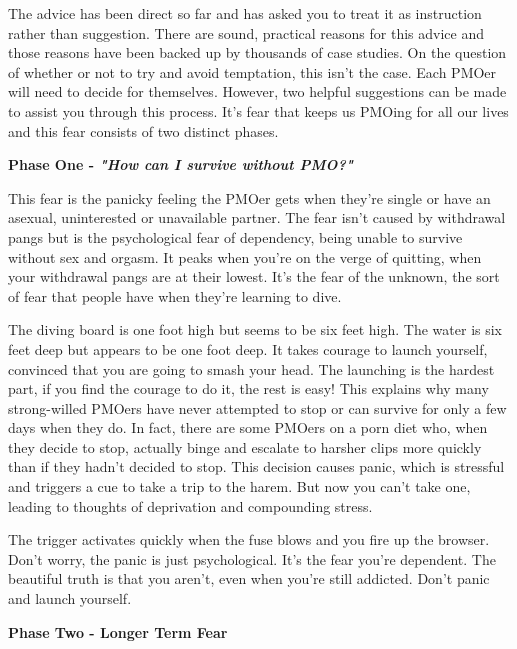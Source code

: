 \documentclass[easypeasy.tex]{subfiles}
\begin{document}
The advice has been direct so far and has asked you to treat it as instruction rather than suggestion. There are sound, practical reasons for this advice and those reasons have been backed up by thousands of case studies. On the question of whether or not to try and avoid temptation, this isn't the case. Each PMOer will need to decide for themselves. However, two helpful suggestions can be made to assist you through this process. It's fear that keeps us PMOing for all our lives and this fear consists of two distinct phases.

\textbf{Phase One - \textit{"How can I survive without PMO?"}}

This fear is the panicky feeling the PMOer gets when they're single or have an asexual, uninterested or unavailable partner. The fear isn't caused by withdrawal pangs but is the psychological fear of dependency, being unable to survive without sex and orgasm. It peaks when you're on the verge of quitting, when your withdrawal pangs are at their lowest. It's the fear of the unknown, the sort of fear that people have when they're learning to dive.

The diving board is one foot high but seems to be six feet high. The water is six feet deep but appears to be one foot deep. It takes courage to launch yourself, convinced that you are going to smash your head. The launching is the hardest part, if you find the courage to do it, the rest is easy! This explains why many strong-willed PMOers have never attempted to stop or can survive for only a few days when they do. In fact, there are some PMOers on a porn diet who, when they decide to stop, actually binge and escalate to harsher clips more quickly than if they hadn't decided to stop. This decision causes panic, which is stressful and triggers a cue to take a trip to the harem. But now you can't take one, leading to thoughts of deprivation and compounding stress.

The trigger activates quickly when the fuse blows and you fire up the browser. Don't worry, the panic is just psychological. It's the fear you're dependent. The beautiful truth is that you aren't, even when you're still addicted. Don't panic and launch yourself.

\textbf{Phase Two - Longer Term Fear}
\end{document}
